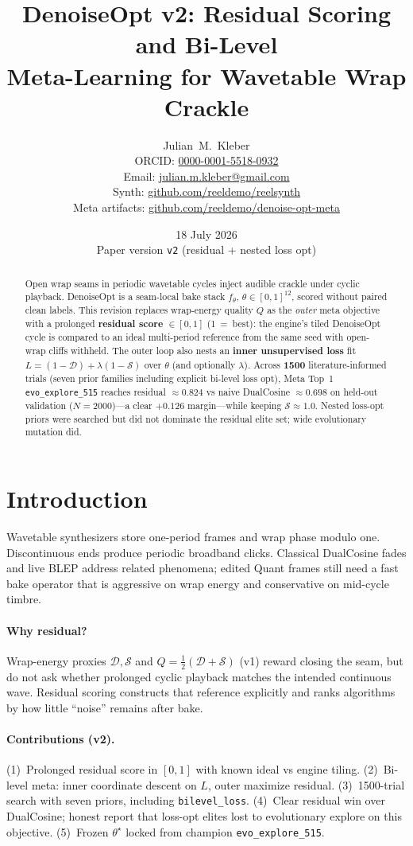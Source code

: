 \documentclass[11pt,a4paper]{article}
\title{\textbf{DenoiseOpt v2:} Residual Scoring and Bi-Level\\
Meta-Learning for Wavetable Wrap Crackle}
\author{
  Julian~M.~Kleber\\
  ORCID: \href{https://orcid.org/0000-0001-5518-0932}{0000-0001-5518-0932}\\
  Email: \href{mailto:julian.m.kleber@gmail.com}{julian.m.kleber@gmail.com}\\[0.6em]
  \small
  Synth:
  \href{https://github.com/reeldemo/reelsynth}{github.com/reeldemo/reelsynth}\\
  Meta artifacts:
  \href{https://github.com/reeldemo/denoise-opt-meta}{github.com/reeldemo/denoise-opt-meta}
}
\date{18 July 2026 \\ \small Paper version \texttt{v2} (residual + nested loss opt)}
\begin{document}
\maketitle

\begin{abstract}
Open wrap seams in periodic wavetable cycles inject audible crackle under cyclic
playback. DenoiseOpt is a seam-local bake stack $f_\theta$, $\theta\in[0,1]^{12}$,
scored without paired clean labels. This revision replaces wrap-energy quality
$Q$ as the \emph{outer} meta objective with a prolonged \textbf{residual score}
$\in[0,1]$ (1~=~best): the engine's tiled DenoiseOpt cycle is compared to an ideal
multi-period reference from the same seed with open-wrap cliffs withheld.
The outer loop also nests an \textbf{inner unsupervised loss} fit
$L=(1-\mathcal{D})+\lambda(1-\mathcal{S})$ over $\theta$ (and optionally $\lambda$).
Across \textbf{1500} literature-informed trials (seven prior families including
explicit bi-level loss opt), Meta Top~1 \texttt{evo\_explore\_515} reaches
residual $\approx 0.824$ vs naive DualCosine $\approx 0.698$ on held-out
validation ($N{=}2000$)---a clear $+0.126$ margin---while keeping
$\mathcal{S}\approx 1.0$. Nested loss-opt priors were searched but did not dominate
the residual elite set; wide evolutionary mutation did.
\end{abstract}

\section{Introduction}
Wavetable synthesizers store one-period frames and wrap phase modulo one.
Discontinuous ends produce periodic broadband clicks. Classical DualCosine fades
and live BLEP address related phenomena; edited Quant frames still need a fast
bake operator that is aggressive on wrap energy and conservative on mid-cycle
timbre.

\paragraph{Why residual?}
Wrap-energy proxies $\mathcal{D},\mathcal{S}$ and $Q=\tfrac12(\mathcal{D}+\mathcal{S})$
(v1) reward closing the seam, but do not ask whether prolonged cyclic playback
matches the intended continuous wave. Residual scoring constructs that reference
explicitly and ranks algorithms by how little ``noise'' remains after bake.

\paragraph{Contributions (v2).}
(1)~Prolonged residual score in $[0,1]$ with known ideal vs engine tiling.
(2)~Bi-level meta: inner coordinate descent on $L$, outer maximize residual.
(3)~1500-trial search with seven priors, including \texttt{bilevel\_loss}.
(4)~Clear residual win over DualCosine; honest report that loss-opt elites lost
to evolutionary explore on this objective.
(5)~Frozen $\theta^\star$ locked from champion \texttt{evo\_explore\_515}.
\end{document}
